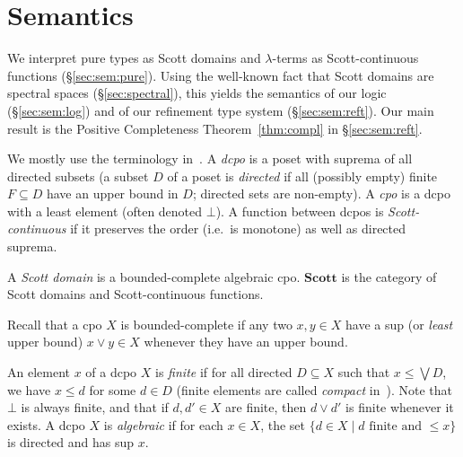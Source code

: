 \documentclass[%
  a4paper,
  UKenglish,
  cleveref,
  autoref,
  thm-restate,
  numberwithinsect,
]{lipics-v2021}
\newcommand\sle\subseteq
\newcommand\Scott{\mathbf{Scott}}
\begin{document}
\section{Semantics}
\label{sec:sem}

We interpret pure types as Scott domains and $\lambda$-terms as Scott-continuous
functions (\S\ref{sec:sem:pure}).
Using the well-known fact that Scott domains are spectral spaces
(\S\ref{sec:spectral}),
this yields the semantics of our logic (\S\ref{sec:sem:log})
and of our refinement type system (\S\ref{sec:sem:reft}).
Our main result is the Positive Completeness Theorem~\ref{thm:compl}
in \S\ref{sec:sem:reft}.


We mostly use the terminology in~\cite[\S 1]{ac98book}.
A \emph{dcpo} is a poset with suprema of all directed subsets
(a subset $D$ of a poset is \emph{directed} if all (possibly empty) finite $F \sle D$
have an upper bound in $D$; directed sets are non-empty).
A \emph{cpo} is a dcpo with a least element (often denoted $\bot$).
A function between dcpos is \emph{Scott-continuous}
if it preserves the order (i.e.\ is monotone) as well as directed suprema.

\begin{definition}
\label{def:scott}
A \emph{Scott domain} is a bounded-complete algebraic cpo.
%
$\Scott$ is the category of Scott domains and Scott-continuous functions.
\end{definition}

Recall that a cpo $X$ is bounded-complete if
any two $x,y \in X$ have a sup (or \emph{least} upper bound)
$x \vee y \in X$ whenever they have an upper bound.

An element $x$ of a dcpo $X$ is \emph{finite}
if for all directed $D \sle X$ such that $x \leq \bigvee D$,
we have $x \leq d$ for some $d \in D$
(finite elements are called \emph{compact} in~\cite{ac98book}).
Note that $\bot$ is always finite,
and that if $d,d' \in X$ are finite,
then $d \vee d'$ is finite whenever it exists.
%
A dcpo $X$ is \emph{algebraic} if for each $x \in X$,
the set $\{ d\in X \mid \text{$d$ finite and $\leq x$} \}$
is directed and has sup $x$.
\end{document}
